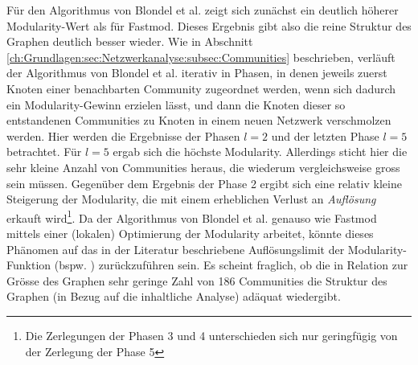 F\"ur den Algorithmus von Blondel et al. zeigt sich zun\"achst ein
deutlich h\"oherer Modularity-Wert als f\"ur Fastmod. Dieses Ergebnis
gibt also die reine Struktur des Graphen deutlich besser wieder.  Wie
in Abschnitt
\ref{ch:Grundlagen:sec:Netzwerkanalyse:subsec:Communities}
beschrieben, verl\"auft der Algorithmus von Blondel et al. iterativ in
Phasen, in denen jeweils zuerst Knoten einer benachbarten Community
zugeordnet werden, wenn sich dadurch ein Modularity-Gewinn erzielen
l\"asst, und dann die Knoten dieser so entstandenen Communities zu
Knoten in einem neuen Netzwerk verschmolzen werden. Hier werden die
Ergebnisse der Phasen $l=2$ und der letzten Phase $l=5$
betrachtet. F\"ur $l=5$ ergab sich die h\"ochste
Modularity. Allerdings sticht hier die sehr kleine Anzahl von
Communities heraus, die wiederum vergleichsweise gross sein
m\"ussen. Gegen\"uber dem Ergebnis der Phase 2 ergibt sich eine
relativ kleine Steigerung der Modularity, die mit einem erheblichen
Verlust an \emph{Aufl\"osung} erkauft wird\footnote{Die Zerlegungen
  der Phasen 3 und 4 unterschieden sich nur geringf\"ugig von der
  Zerlegung der Phase 5}. Da der Algorithmus von Blondel et
al. genauso wie Fastmod mittels einer (lokalen) Optimierung der
Modularity arbeitet, k\"onnte dieses Ph\"anomen auf das in der
Literatur beschriebene Aufl\"osungslimit der Modularity-Funktion
(bspw. \cite{Fortunato2007} \cite{Good2009}) zur\"uckzuf\"uhren
sein. Es scheint fraglich, ob die in Relation zur Gr\"osse des Graphen
sehr geringe Zahl von 186 Communities die Struktur des Graphen (in
Bezug auf die inhaltliche Analyse) ad\"aquat wiedergibt.

